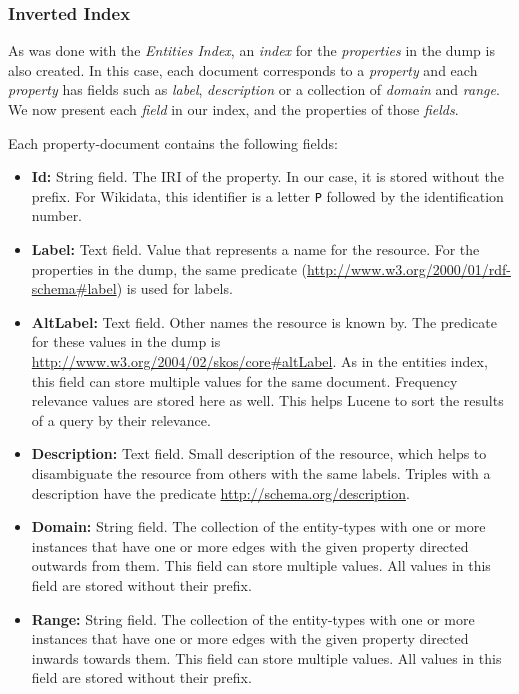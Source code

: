 \subsubsection{Inverted Index}
As  was done with the \textit{Entities Index}, an \textit{index} for the \textit{properties} in the dump is also created. In this case, each document corresponds to a \textit{property} and each \textit{property} has fields such as \textit{label}, \textit{description} or a collection of \textit{domain} and \textit{range}. 
We now present each \textit{field} in our index, and the properties of those \textit{fields}.

Each property-document contains the following fields:
\begin{itemize}
    \item \textbf{Id:} String field. The IRI of the property. In our case, it is  stored without the prefix. For Wikidata, this identifier is a letter \texttt{P} followed by the identification number.
    \item \textbf{Label:} Text field.  Value that represents a name for the resource.  For the properties in the dump, the same predicate (\url{http://www.w3.org/2000/01/rdf-schema#label}) is used for labels. 
    \item \textbf{AltLabel:} Text field. Other names the resource is known by. The predicate for these values in the dump is \url{http://www.w3.org/2004/02/skos/core#altLabel}. As in the entities index, this field can store multiple values for the same document. Frequency relevance values are stored here as well. This helps Lucene to sort the results of a query by their relevance.
    \item \textbf{Description:} Text field. Small description of the resource, which helps to disambiguate the resource from others with the same labels. Triples with a description have the predicate \url{http://schema.org/description}.
    \item \textbf{Domain:} String field. The collection of the entity-types with one or more instances that have one or more edges with the given property directed outwards from them. This field can store multiple values. All values in this field are stored without their prefix.
    \item \textbf{Range:} String field. The collection of the entity-types with one or more instances that have one or more edges with the given property directed inwards towards them. This field can store multiple values. All values in this field are stored without their prefix.
\end{itemize}

